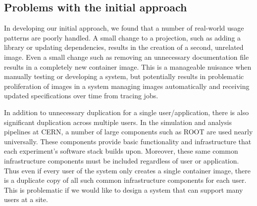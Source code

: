 \documentclass[conference]{IEEEtran}
\begin{document}


\subsection{Problems with the initial approach}

In developing our initial approach,
we found that a number of real-world usage patterns are poorly handled.
A small change to a projection,
such as adding a library or updating dependencies,
results in the creation of a second, unrelated image.
Even a small change such as removing an unnecessary documentation file results in a completely new container image.
This is a manageable nuisance when manually testing or developing a system,
but potentially results in problematic proliferation of images in a system managing images automatically and receiving updated specifications over time from tracing jobs.

In addition to unnecessary duplication for a single user/application,
there is also significant duplication across multiple users.
In the simulation and analysis pipelines at CERN,
a number of large components such as ROOT are used nearly universally.
These components provide basic functionality and infrastructure that each experiment's software stack builds upon.
Moreover, these same common infrastructure components must be included regardless of user or application.
Thus even if every user of the system only creates a single container image,
there is a duplicate copy of all such common infrastructure components for each user.
This is problematic if we would like to design a system that can support many users at a site.
\end{document}
